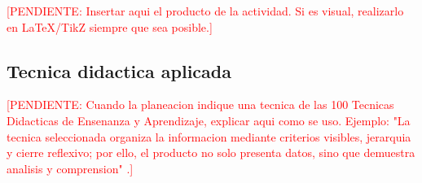 \documentclass[
	spanish,
	letterpaper, oneside
]{article}
\newcommand{\pendiente}[1]{\textcolor{red}{[PENDIENTE: #1]}}
\begin{document}
\pendiente{Insertar aqui el producto de la actividad. Si es visual, realizarlo en LaTeX/TikZ siempre que sea posible.}

\subsection{Tecnica didactica aplicada}

\pendiente{Cuando la planeacion indique una tecnica de las 100 Tecnicas Didacticas de Ensenanza y Aprendizaje, explicar aqui como se uso. Ejemplo: "La tecnica seleccionada organiza la informacion mediante criterios visibles, jerarquia y cierre reflexivo; por ello, el producto no solo presenta datos, sino que demuestra analisis y comprension" \citep{unadm100TecnicasDidacticas2023}.}

%
\end{document}
